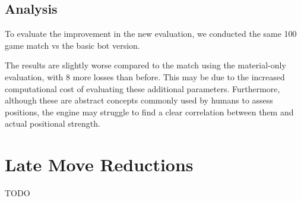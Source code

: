 \subsection{Analysis}

To evaluate the improvement in the new evaluation, we conducted the same 100 game match vs the basic bot version. 

\begin{center}
\medskip
\end{center}

\noindent The results are slightly worse compared to the match using the material-only evaluation, with 8 more losses than before. This may be due to the increased computational cost of evaluating these additional parameters. Furthermore, although these are abstract concepts commonly used by humans to assess positions, the engine may struggle to find a clear correlation between them and actual positional strength.

\section{Late Move Reductions}
TODO
%
%
%
%
